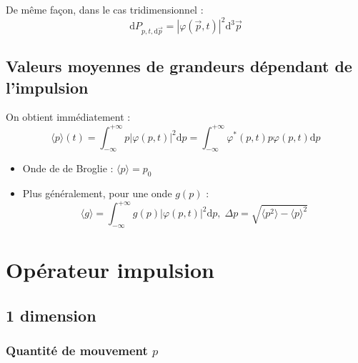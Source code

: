 De même façon, dans le cas tridimensionnel :
\begin{equation}
  \mathrm{d}P _{p, t, \mathrm{d} \overrightarrow{p}} = |\varphi(\overrightarrow{p},t)| ^{2} \mathrm{d} ^{3} \overrightarrow{p}
\end{equation}

\subsection{Valeurs moyennes de grandeurs dépendant de l'impulsion} %
\label{sub:Valeurs moyennes de grandeurs dépendant de l'impulsion}

On obtient immédiatement : 
\begin{equation}
  \langle p \rangle(t) = \int_{- \infty}^{+ \infty} p |\varphi(p,t)| ^{2} \mathrm{d} p = \int_{- \infty}^{+ \infty} \varphi ^{*}(p, t) p \varphi(p, t) \mathrm{d}p
\label{eq:1}
\end{equation}

\begin{itemize}

    \item Onde de de Broglie : $\langle p \rangle = p_0$ 
    \item Plus généralement, pour une onde $g(p)$ : 
      \begin{equation}
        \langle g \rangle = \int_{- \infty}^{+ \infty} g(p) |\varphi(p,t)| ^{2} \mathrm{d}p, \; \Delta p = \sqrt{\langle p ^{2} \rangle - \langle p \rangle ^{2}}
      \end{equation}

\end{itemize}

\section{Opérateur impulsion} %
\label{sec:Opérateur impulsion}

\subsection{1 dimension} %
\label{sub:Opérateur impulsion}

\subsubsection{Quantité de mouvement $p$} %
\label{sec:Quantité de mouvement $p$}

